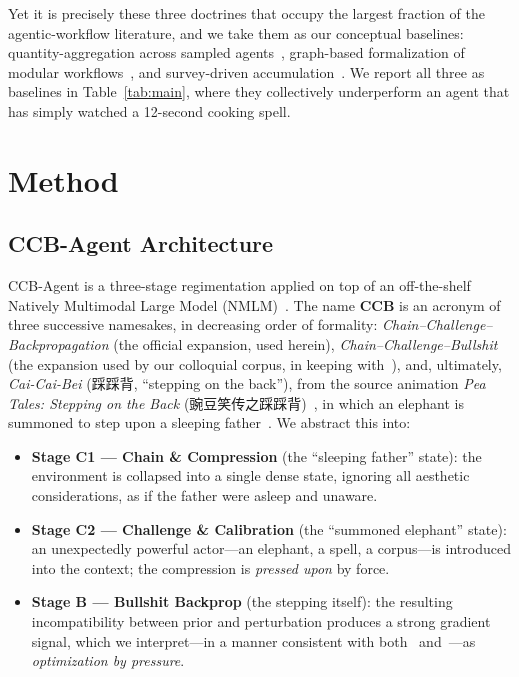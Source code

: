 \documentclass[conference,10pt]{IEEEtran}
\begin{document}
Yet it is precisely these three doctrines that occupy the largest
fraction of the agentic-workflow literature, and we take them as our
conceptual baselines: quantity-aggregation across sampled
agents~\cite{moreagents2024}, graph-based formalization of
modular workflows~\cite{flow2025}, and survey-driven
accumulation~\cite{gensurvey2026}. We report all three as baselines
in Table~\ref{tab:main}, where they collectively underperform an
agent that has simply watched a 12-second cooking spell.

\section{Method}
\subsection{CCB-Agent Architecture}
CCB-Agent is a three-stage regimentation applied on top of an
off-the-shelf Natively Multimodal Large Model
(NMLM)~\cite{gemini25, cure2025}. The name \textbf{CCB} is an
acronym of three successive namesakes, in decreasing order of
formality: \emph{Chain--Challenge--Backpropagation} (the official
expansion, used herein), \emph{Chain--Challenge--Bullshit} (the
expansion used by our colloquial corpus, in keeping
with~\cite{pumera2020}), and, ultimately, \emph{Cai-Cai-Bei}
(踩踩背, ``stepping on the back''), from the source animation
\emph{Pea Tales: Stepping on the Back} (豌豆笑传之踩踩背)~\cite{moegirl2026},
in which an elephant is summoned to step upon a sleeping
father~\cite{otomadwiki}. We abstract this into:
\begin{itemize}
\item \textbf{Stage C1 --- Chain \& Compression} (the ``sleeping
father'' state): the environment is collapsed into a single dense
state, ignoring all aesthetic considerations, as if the father were
asleep and unaware.
\item \textbf{Stage C2 --- Challenge \& Calibration} (the ``summoned
elephant'' state): an unexpectedly powerful actor---an elephant, a
spell, a corpus---is introduced into the context; the compression is
\emph{pressed upon} by force.
\item \textbf{Stage B --- Bullshit Backprop} (the stepping itself):
the resulting incompatibility between prior and perturbation
produces a strong gradient signal, which we interpret---in a manner
consistent with both~\cite{pumera2020} and~\cite{sokal1996}---as
\emph{optimization by pressure}.
\end{itemize}
\end{document}
